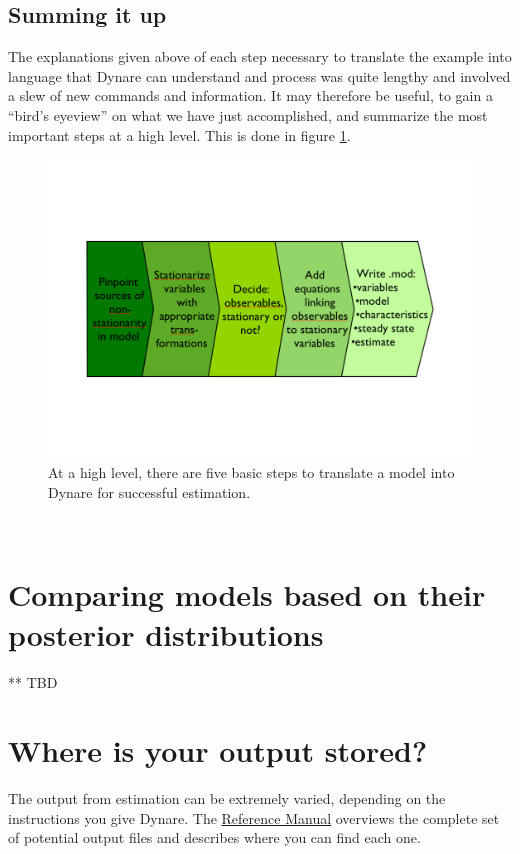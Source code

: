 \subsection{Summing it up}
The explanations given above of each step necessary to translate the \citet{Schorfheide2000} example into language that Dynare can understand and process was quite lengthy and involved a slew of new commands and information. It may therefore be useful, to gain a ``bird's eyeview'' on what we have just accomplished, and summarize the most important steps at a high level. This is done in figure \ref{fig:estsumm}.\\
\begin{figure} \label{fig:estsumm}
\begin{center} 
\includegraphics[width=1.0\textwidth]{P_flowest} 
\end{center} 
\caption[Steps of model estimation]{At a high level, there are five basic steps to translate a model into Dynare for successful estimation.} 
\end{figure}\\


\section{Comparing models based on their posterior distributions}
** TBD

\section{Where is your output stored?}
The output from estimation can be extremely varied, depending on the instructions you give Dynare. The \href{http://www.dynare.org/documentation-and-support/manual}{Reference Manual} overviews the complete set of potential output files and describes where you can find each one. 